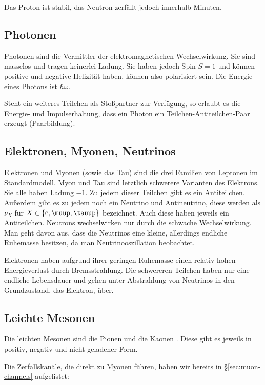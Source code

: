 \documentclass[11pt, ngerman, fleqn, DIV=15, headinclude, BCOR=2cm]{scrreprt}
\begin{document}
Das Proton ist stabil, das Neutron zerfällt jedoch innerhalb Minuten.

\subsection{Photonen}

Photonen sind die Vermittler der elektromagnetischen Wechselwirkung. Sie sind
masselos und tragen keinerlei Ladung. Sie haben jedoch Spin $S = 1$ und können
positive und negative Helizität haben, können also polarisiert sein. Die
Energie eines Photons ist $\hbar \omega$.

Steht ein weiteres Teilchen als Stoßpartner zur Verfügung, so erlaubt es die
Energie- und Impulserhaltung, dass ein Photon ein Teilchen-Antiteilchen-Paar
erzeugt (Paarbildung).

\subsection{Elektronen, Myonen, Neutrinos}

Elektronen und Myonen (sowie das Tau) sind die drei Familien von Leptonen im
Standardmodell. Myon und Tau sind letztlich schwerere Varianten des Elektrons.
Sie alle haben Ladung $-1$. Zu jedem dieser Teilchen gibt es ein Antiteilchen.
Außerdem gibt es zu jedem noch ein Neutrino und Antineutrino, diese werden als
$\nu_X$ für $X \in \{ \eup, \muup, \tauup \}$ bezeichnet. Auch diese haben
jeweils ein Antiteilchen. Neutrons wechselwirken nur durch die schwache
Wechselwirkung. Man geht davon aus, dass die Neutrinos eine kleine, allerdings
endliche Ruhemasse besitzen, da man Neutrinooszillation beobachtet.

Elektronen haben aufgrund ihrer geringen Ruhemasse einen relativ hohen
Energieverlust durch Bremsstrahlung. Die schwereren Teilchen haben nur eine
endliche Lebensdauer und gehen unter Abstrahlung von Neutrinos in den
Grundzustand, das Elektron, über.

\subsection{Leichte Mesonen}

Die leichten Mesonen sind die Pionen und die Kaonen
\parencite[Tabelle~19.6]{meschede-gerthsen_24}. Diese gibt es jeweils in
positiv, negativ und nicht geladener Form.

Die Zerfallskanäle, die direkt zu Myonen führen, haben wir bereits in
§\ref{sec:muon-channels} aufgelistet:
\end{document}
